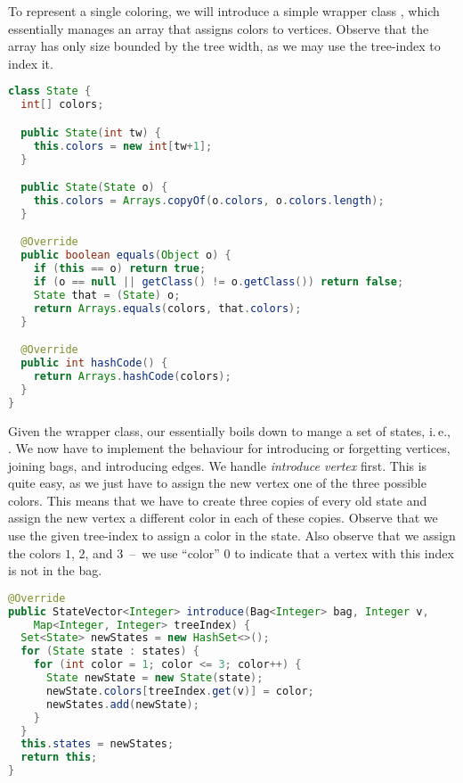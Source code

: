\documentclass[a4paper, ukenglish, twoside, openright]{jdrasilmanual}
\begin{document}
To represent a single coloring, we will introduce a simple wrapper
class , which essentially manages an array that assigns
colors to vertices. Observe that the array has only size bounded by
the tree width, as we may use the tree-index to index it.
\begin{lstlisting}[language=Java]
class State {
  int[] colors;

  public State(int tw) {
    this.colors = new int[tw+1];
  }

  public State(State o) {
    this.colors = Arrays.copyOf(o.colors, o.colors.length);
  }

  @Override
  public boolean equals(Object o) {
    if (this == o) return true;
    if (o == null || getClass() != o.getClass()) return false;
    State that = (State) o;
    return Arrays.equals(colors, that.colors);
  }

  @Override
  public int hashCode() {
    return Arrays.hashCode(colors);
  }
}
\end{lstlisting}

Given the wrapper class, our  essentially
boils down to mange a set of states, i.\,e., . We now have to implement the behaviour for introducing or
forgetting vertices, joining bags, and introducing edges. We handle
\emph{introduce vertex} first. This is quite easy, as we just have to
assign the new vertex one of the three possible colors. This means
that we have to create three copies of every old state and assign the
new vertex a different color in each of these copies. Observe that we
use the given tree-index to assign a color in the state. Also observe that we
assign the colors $1$, $2$, and $3$~--~we use ``color'' $0$ to
indicate that a vertex with this index is not in the bag.

\begin{lstlisting}[language=Java]
@Override
public StateVector<Integer> introduce(Bag<Integer> bag, Integer v,
    Map<Integer, Integer> treeIndex) {
  Set<State> newStates = new HashSet<>();
  for (State state : states) {
    for (int color = 1; color <= 3; color++) {
      State newState = new State(state);
      newState.colors[treeIndex.get(v)] = color;
      newStates.add(newState);
    }
  }
  this.states = newStates;
  return this;
}
\end{lstlisting}
\end{document}
